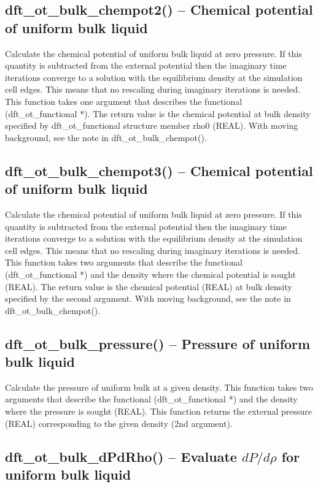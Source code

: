 \documentclass[12pt,letterpaper]{report}
\begin{document}
\subsection{dft\_ot\_bulk\_chempot2() -- Chemical potential of uniform bulk liquid}

Calculate the chemical potential of uniform bulk liquid at zero pressure. If this quantity is subtracted from the external potential then the imaginary time iterations converge to a solution with the equilibrium density at the simulation cell edges. This means that no rescaling during imaginary iterations is needed. This function takes one argument that describes the functional (dft\_ot\_functional *). The return value is the chemical potential at bulk density specified by dft\_ot\_functional structure member rho0 (REAL). With moving background, see the note in dft\_ot\_bulk\_chempot().

\subsection{dft\_ot\_bulk\_chempot3() -- Chemical potential of uniform bulk liquid}

Calculate the chemical potential of uniform bulk liquid at zero pressure. If this quantity is subtracted from the external potential then the imaginary time iterations converge to a solution with the equilibrium density at the simulation cell edges. This means that no rescaling during imaginary iterations is needed. This function takes two arguments that describe the functional (dft\_ot\_functional *) and the density where the chemical potential is sought (REAL). The return value is the chemical potential (REAL) at bulk density specified by the second argument. With moving background, see the note in dft\_ot\_bulk\_chempot().

\subsection{dft\_ot\_bulk\_pressure() -- Pressure of uniform bulk liquid}

Calculate the pressure of uniform bulk at a given density. This function takes two arguments that describe the functional (dft\_ot\_functional *) and the density where the pressure is sought (REAL). This function returns the external pressure (REAL) corresponding to the given density (2nd argument).

\subsection{dft\_ot\_bulk\_dPdRho() -- Evaluate $dP/d\rho$ for uniform bulk liquid}
\end{document}
